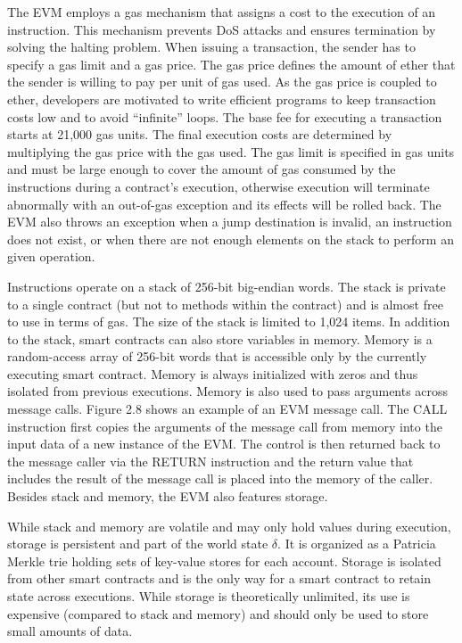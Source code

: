         The EVM employs a gas mechanism that assigns a cost to the execution of an instruction.
        This mechanism prevents DoS attacks and ensures termination by solving the halting problem.
        When issuing a transaction, the sender has to specify a gas limit and a gas price.
        The gas price defines the amount of ether that the sender is willing to pay per unit of gas used.
        As the gas price is coupled to ether, developers are motivated to write efficient programs to keep transaction costs low and to avoid “infinite” loops.
        The base fee for executing a transaction starts at 21,000 gas units.
        The final execution costs are determined by multiplying the gas price with the gas used.
        The gas limit is specified in gas units and must be large enough to cover the amount of gas consumed by the instructions during a contract's execution, otherwise execution will terminate abnormally with an out-of-gas exception and its effects will be rolled back.
        The EVM also throws an exception when a jump destination is invalid, an instruction does not exist, or when there are not enough elements on the stack to perform an given operation.

        Instructions operate on a stack of 256-bit big-endian words.
        The stack is private to a single contract (but not to methods within the contract) and is almost free to use in terms of gas.
        The size of the stack is limited to 1,024 items.
        In addition to the stack, smart contracts can also store variables in memory.
        Memory is a random-access array of 256-bit words that is accessible only by the currently executing smart contract.
        Memory is always initialized with zeros and thus isolated from previous executions.
        Memory is also used to pass arguments across message calls.
        Figure 2.8 shows an example of an EVM message call.
        The CALL instruction first copies the arguments of the message call from memory into the input data of a new instance of the EVM.
        The control is then returned back to the message caller via the RETURN instruction and the return value that includes the result of the message call is placed into the memory of the caller.
        Besides stack and memory, the EVM also features storage.

        While stack and memory are volatile and may only hold values during execution, storage is persistent and part of the world state $\delta$.
        It is organized as a Patricia Merkle trie holding sets of key-value stores for each account.
        Storage is isolated from other smart contracts and is the only way for a smart contract to retain state across executions.
        While storage is theoretically unlimited, its use is expensive (compared to stack and memory) and should only be used to store small amounts of data.



